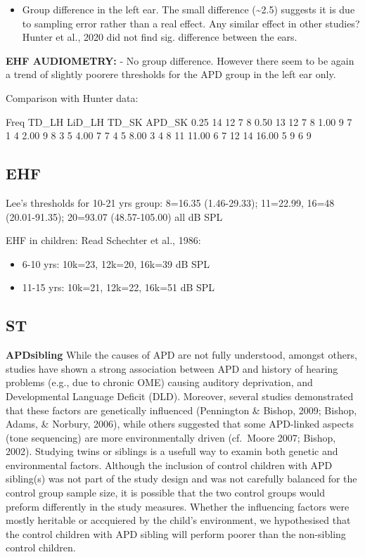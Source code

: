 \documentclass[a4paper, twoside]{templates/ociamthesis}
\providecommand{\tightlist}{%
  \setlength{\itemsep}{0pt}\setlength{\parskip}{0pt}}
\begin{document}
\begin{itemize}
\tightlist
\item
  Group difference in the left ear. The small difference (\textasciitilde2.5) suggests it is due to sampling error rather than a real effect. Any similar effect in other studies? Hunter et al., 2020 did not find sig. difference between the ears.
\end{itemize}

\textbf{EHF AUDIOMETRY:}
- No group difference. However there seem to be again a trend of slightly poorere thresholds for the APD group in the left ear only.

Comparison with Hunter data:

Freq TD\_LH LiD\_LH TD\_SK APD\_SK
0.25 14 12 7 8
0.50 13 12 7 8
1.00 9 7 1 4
2.00 9 8 3 5
4.00 7 7 4 5
8.00 3 4 8 11
11.00 6 7 12 14
16.00 5 9 6 9

\hypertarget{ehf}{%
\subsection{EHF}\label{ehf}}

Lee's thresholds for 10-21 yrs group: 8=16.35 (1.46-29.33); 11=22.99, 16=48 (20.01-91.35); 20=93.07 (48.57-105.00) all dB SPL

EHF in children: Read Schechter et al., 1986:

\begin{itemize}
\item
  6-10 yrs: 10k=23, 12k=20, 16k=39 dB SPL
\item
  11-15 yrs: 10k=21, 12k=22, 16k=51 dB SPL
\end{itemize}

\hypertarget{st-2}{%
\subsection{ST}\label{st-2}}

\begin{correction}
\textbf{APDsibling} While the causes of APD are not fully understood,
amongst others, studies have shown a strong association between APD and
history of hearing problems (e.g., due to chronic OME) causing auditory
deprivation, and Developmental Language Deficit (DLD). Moreover, several
studies demonstrated that these factors are genetically influenced
(Pennington \& Bishop, 2009; Bishop, Adams, \& Norbury, 2006), while
others suggested that some APD-linked aspects (tone sequencing) are more
environmentally driven (cf.~Moore 2007; Bishop, 2002). Studying twins or
siblings is a usefull way to examin both genetic and environmental
factors. Although the inclusion of control children with APD sibling(s)
was not part of the study design and was not carefully balanced for the
control group sample size, it is possible that the two control groups
would preform differently in the study measures. Whether the influencing
factors were mostly heritable or accquiered by the child's environment,
we hypothesised that the control children with APD sibling will perform
poorer than the non-sibling control children.
\end{correction}
\end{document}
